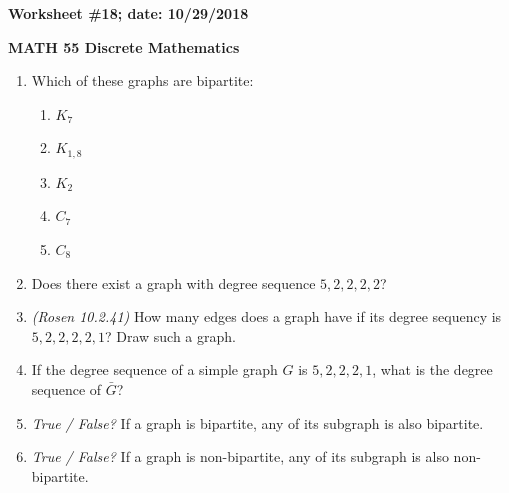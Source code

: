 \documentclass{article}
\begin{document}
{\bf Worksheet \#18; date: 10/29/2018}

{\bf MATH 55 Discrete Mathematics}

\begin{enumerate}
\item Which of these graphs are bipartite:
\begin{enumerate}
\item $K_7$
\item $K_{1, 8}$
\item $K_2$
\item $C_7$
\item $C_8$
\end{enumerate}

\item Does there exist a graph with degree sequence $5, 2, 2, 2, 2$?

\item {\em (Rosen 10.2.41)} How many edges does a graph have if its degree sequency is $5, 2, 2, 2, 2, 1$? Draw such a graph.

\item If the degree sequence of a simple graph $G$ is $5, 2, 2, 2, 1$, what is the degree sequence of $\bar{G}$?

\item {\em True / False?} If a graph is bipartite, any of its subgraph is also bipartite.

\item {\em True / False?} If a graph is non-bipartite, any of its subgraph is also non-bipartite.
\end{enumerate}
\end{document}
